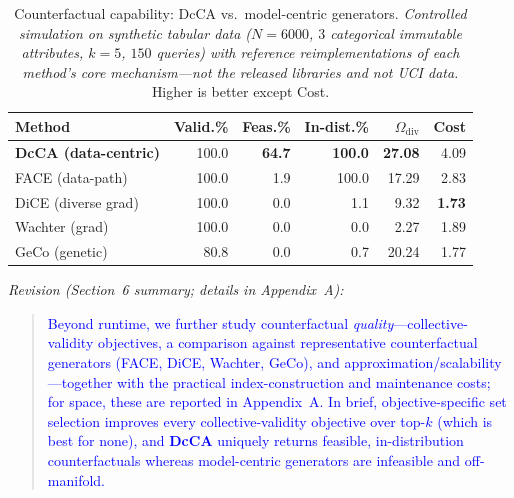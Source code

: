 \begin{table}[h]
\centering\small
\caption{Counterfactual capability: DcCA vs.\ model-centric generators. \emph{Controlled simulation on synthetic tabular data ($N{=}6000$, $3$ categorical immutable attributes, $k{=}5$, $150$ queries) with reference reimplementations of each method's core mechanism---not the released libraries and not UCI data.} Higher is better except Cost.}
\label{tab:baselines}
\begin{tabular}{lrrrrr}
\toprule
Method & Valid.\% & Feas.\% & In-dist.\% & $\Omega_{\text{div}}$ & Cost \\
\midrule
\textbf{DcCA (data-centric)}        & 100.0 & \textbf{64.7} & \textbf{100.0} & \textbf{27.08} & 4.09 \\
FACE (data-path)~\cite{poyiadzi2020face}      & 100.0 & 1.9  & 100.0 & 17.29 & 2.83 \\
DiCE (diverse grad)~\cite{mothilal2020explaining}   & 100.0 & 0.0  & 1.1   & 9.32  & \textbf{1.73} \\
Wachter (grad)~\cite{wachter2017counterfactual}        & 100.0 & 0.0  & 0.0   & 2.27  & 1.89 \\
GeCo (genetic)~\cite{schleich2021geco}        & 80.8  & 0.0  & 0.7   & 20.24 & 1.77 \\
\bottomrule
\end{tabular}
\end{table}

\noindent\emph{Revision (Section~6 summary; details in Appendix~A):}
\begin{quote}
\textcolor{blue}{Beyond runtime, we further study counterfactual \emph{quality}---collective-validity objectives, a comparison against representative counterfactual generators (FACE, DiCE, Wachter, GeCo), and approximation/scalability---together with the practical index-construction and maintenance costs; for space, these are reported in Appendix~A. In brief, objective-specific set selection improves every collective-validity objective over top-$k$ (which is best for none), and \textbf{DcCA} uniquely returns feasible, in-distribution counterfactuals whereas model-centric generators are infeasible and off-manifold.}
\end{quote}
